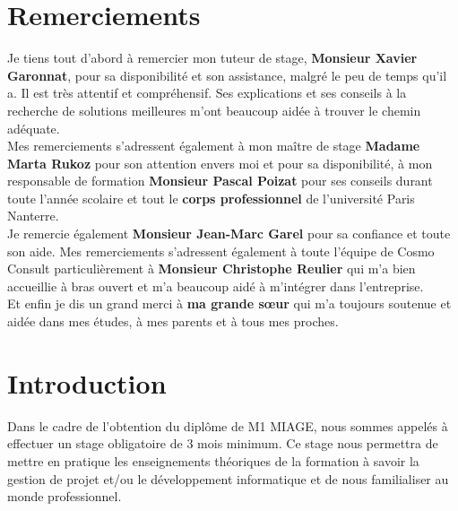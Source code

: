 \documentclass[12pt]{article}
\begin{document}
\newpage
\section{Remerciements}
\hspace{1cm} Je tiens tout d’abord à remercier mon tuteur de stage, \textbf{Monsieur Xavier Garonnat}, pour sa disponibilité et son assistance, malgré le peu de temps qu’il a. Il est très attentif et compréhensif. Ses explications et ses conseils à la recherche de solutions meilleures m’ont beaucoup aidée à trouver le chemin adéquate.\\ 

\hspace{1cm} Mes remerciements s’adressent également à mon maître de stage \textbf{Madame Marta Rukoz} pour son attention envers moi et pour sa disponibilité, à mon responsable de formation \textbf{Monsieur Pascal Poizat} pour ses conseils durant toute l’année scolaire et tout le \textbf{corps professionnel} de l’université Paris Nanterre.\\ 

\hspace{1cm} Je remercie également \textbf{Monsieur Jean-Marc Garel} pour sa confiance et toute son aide. Mes remerciements s’adressent également à toute l’équipe de Cosmo Consult particulièrement à \textbf{Monsieur Christophe Reulier} qui m’a bien accueillie à bras ouvert et m’a beaucoup aidé à m’intégrer dans l’entreprise.\\

\hspace{1cm} Et enfin je dis un grand merci à \textbf{ma grande sœur} qui m’a toujours soutenue et aidée dans mes études, à mes parents et à tous mes proches.


\newpage
\tableofcontents
\pagebreak


\section{Introduction}
\hspace{1cm} Dans le cadre de l'obtention du diplôme de M1 MIAGE, nous sommes appelés à effectuer un stage obligatoire de 3 mois minimum. Ce stage nous permettra de mettre en pratique les enseignements théoriques de la formation à savoir la gestion de projet et/ou le développement informatique et de nous familialiser au monde professionnel.\\
 
\end{document}
